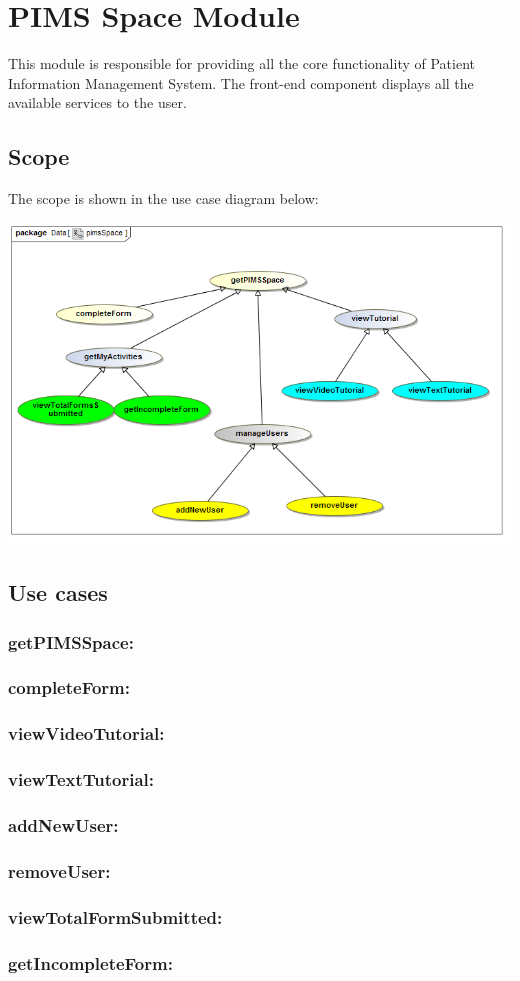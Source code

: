 \section{PIMS Space Module}
This module is responsible for providing all the core functionality of Patient Information Management System. The front-end component displays all the available services to the user. \par 

\subsection{Scope}
The scope is shown in the use case diagram below: \par
\includegraphics[width=0.75\linewidth]{./Graphics/pimsSpace/pimsSpace}

\subsection{Use cases}
	\subsubsection{getPIMSSpace:} 
	\subsubsection{completeForm:}
	\subsubsection{viewVideoTutorial:}
	\subsubsection{viewTextTutorial:}
	\subsubsection{addNewUser:}
	\subsubsection{removeUser:}
	\subsubsection{viewTotalFormSubmitted:}
	\subsubsection{getIncompleteForm:}
	